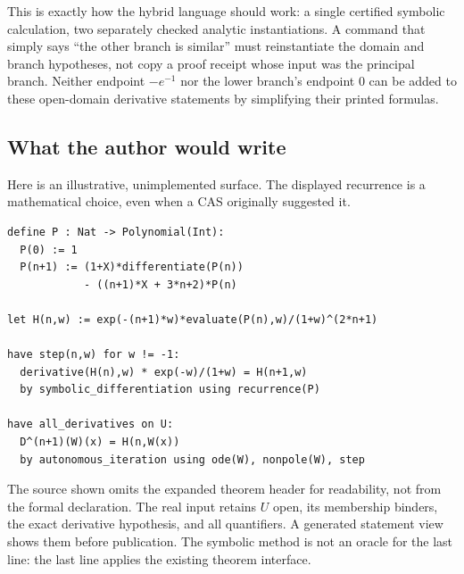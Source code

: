 \documentclass[11pt,a4paper]{article}
\theoremstyle{remark}
\begin{document}
This is exactly how the hybrid language should work: a single certified symbolic
calculation, two separately checked analytic instantiations. A command that simply
says ``the other branch is similar'' must reinstantiate the domain and branch
hypotheses, not copy a proof receipt whose input was the principal branch.
Neither endpoint $-e^{-1}$ nor the lower branch's endpoint $0$ can be added to
these open-domain derivative statements by simplifying their printed formulas.

\subsection{What the author would write}
Here is an illustrative, unimplemented surface. The displayed recurrence is a
mathematical choice, even when a CAS originally suggested it.
\par\smallskip\noindent\begin{minipage}{\linewidth}
\begin{lstlisting}
define P : Nat -> Polynomial(Int):
  P(0) := 1
  P(n+1) := (1+X)*differentiate(P(n))
            - ((n+1)*X + 3*n+2)*P(n)

let H(n,w) := exp(-(n+1)*w)*evaluate(P(n),w)/(1+w)^(2*n+1)

have step(n,w) for w != -1:
  derivative(H(n),w) * exp(-w)/(1+w) = H(n+1,w)
  by symbolic_differentiation using recurrence(P)

have all_derivatives on U:
  D^(n+1)(W)(x) = H(n,W(x))
  by autonomous_iteration using ode(W), nonpole(W), step
\end{lstlisting}
\end{minipage}\par\smallskip
The source shown omits the expanded theorem header for readability, not from the
formal declaration. The real input retains $U$ open, its membership binders,
the exact derivative hypothesis, and all quantifiers. A generated statement view
shows them before publication. The symbolic method is not an oracle for the
last line: the last line applies the existing theorem interface.
\end{document}
